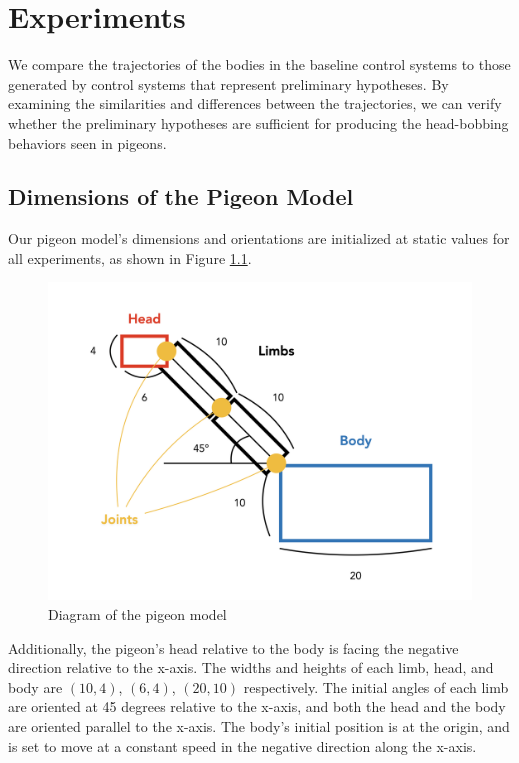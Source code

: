 \chapter{Experiments} \label{ch:experiments}
We compare the trajectories of the bodies in the baseline control systems to those generated by control systems that represent preliminary hypotheses. By examining the similarities and differences between the trajectories, we can verify whether the preliminary hypotheses are sufficient for producing the head-bobbing behaviors seen in pigeons.

\section{Dimensions of the Pigeon Model}
  Our pigeon model's dimensions and orientations are initialized at static values for all experiments, as shown in Figure \ref{fig:pigeon_dimension}.
    \begin{figure}[H]
        \centering
        \includegraphics[width=1\textwidth]{figures/pigeon_diagram/pigeon_diagram_001.png}
        \caption{Diagram of the pigeon model}
        \label{fig:pigeon_dimension}
    \end{figure}
  Additionally, the pigeon's head relative to the body is facing the negative direction relative to the x-axis.
  The widths and heights of each limb, head, and body are $(10, 4)$, $(6, 4)$, $(20, 10)$ respectively.
  The initial angles of each limb are oriented at 45 degrees relative to the x-axis, and both the head and the body are oriented parallel to the x-axis.
  The body's initial position is at the origin, and is set to move at a constant speed in the negative direction along the x-axis.

